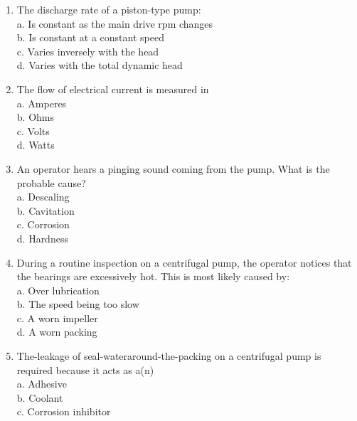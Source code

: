 \documentclass{article}
\begin{document}
\begin{enumerate}[1.]
\item The discharge rate of a piston-type pump:\\

a. Is constant as the main drive rpm changes\\

b. Is constant at a constant speed\\

c. Varies inversely with the head\\

d. Varies with the total dynamic head\\

  \item The flow of electrical current is measured in\\
a. Amperes\\

b. Ohms\\

c. Volts\\

d. Watts\\


\item An operator hears a pinging sound coming from the pump. What is the probable cause?\\
a.	Descaling\\
b. Cavitation\\
c. Corrosion \\
d. Hardness\\

\item During a routine inspection on a centrifugal pump, the operator notices that the bearings are excessively hot. This is most likely caused by:\\
a. Over lubrication\\
b. The speed being too slow\\
c. A worn impeller\\
d. A worn packing\\

\item The-leakage of seal-wateraround-the-packing on a centrifugal pump is required because it acts as a(n)\\

a. Adhesive\\

b. Coolant\\

c. Corrosion inhibitor\\


\end{enumerate}
\end{document}
